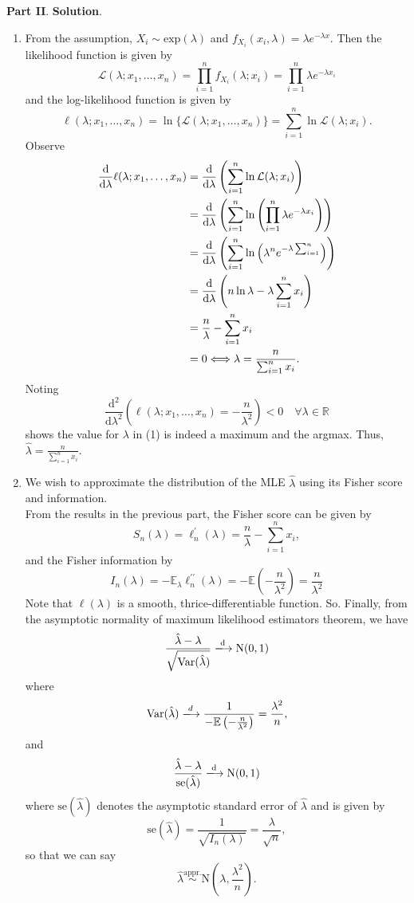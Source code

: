 \documentclass{article}
\begin{document}
\textbf{Part II}. \textbf{Solution}.
\begin{enumerate}
    \item From the assumption, $X_i \sim \text{exp}(\lambda)$ and $f_{X_i}(x_i, \lambda) = \lambda e^{-\lambda x}$. Then the likelihood function is given by \[\mathcal{L}(\lambda; x_1, \ldots, x_n) = \prod_{i=1}^n f_{X_i}(\lambda; x_i) = \prod_{i=1}^n \lambda e^{-\lambda x_i}\]and the log-likelihood function is given by \[\ell(\lambda; x_1, \ldots, x_n) = \ln \{ \mathcal{L}(\lambda; x_1, \ldots, x_n)\} = \sum_{i=1}^n \ln \mathcal{L}(\lambda; x_i).\]
    Observe
    \begin{align}
        \frac{\mathrm{d}}{\mathrm{d}\lambda}\ell(\lambda; x_1, \ldots, x_n) &=  \frac{\mathrm{d}}{\mathrm{d\lambda}}\left(\sum_{i=1}^n \ln \mathcal{L}(\lambda; x_i)\right) \notag \\
        &= \frac{\mathrm{d}}{\mathrm{d}\lambda}\left(\sum_{i=1}^n \ln \left( \prod_{i=1}^n \lambda e^{-\lambda x_i} \right) \right) \notag \\
        &= \frac{\mathrm{d}}{\mathrm{d}\lambda}\left(\sum_{i=1}^n \ln \left( \lambda^n e^{-\lambda \sum_{i=1}^n} \right) \right) \notag \\
        &= \frac{\mathrm{d}}{\mathrm{d}\lambda}\left( n \ln \lambda -\lambda \sum_{i=1}^n x_i \right) \notag \\
        &= \frac{n}{\lambda} - \sum_{i=1}^n x_i \notag \\
        &= 0 \Longleftrightarrow \lambda = \frac{n}{\sum_{i=1}^n x_i}.
    \end{align}
    Noting
    \[\frac{\mathrm{d}^2}{\mathrm{d}\lambda^2}\left( \ell(\lambda; x_1, \ldots, x_n) = -\frac{n}{\lambda^2}\right) < 0 \quad \forall \lambda \in \mathbb{R} \]shows the value for $\lambda$ in (1) is indeed a maximum and the argmax. Thus, $\hat{\lambda} = \frac{n}{\sum_{i=1}^n x_i}.$
    \item We wish to approximate the distribution of the MLE $\hat{\lambda}$ using its Fisher score and information.\\From the results in the previous part, the Fisher score can be given by \[S_n(\lambda) = \ell^\prime_n(\lambda) = \frac{n}{\lambda} - \sum_{i=1}^n x_i, \]and the Fisher information by \[I_n(\lambda) = -\mathbb{E}_\lambda \ell^{\prime \prime} _n(\lambda) = -\mathbb{E}\left(-\frac{n}{\lambda^2}\right) = \frac{n}{\lambda^2}\]
    Note that $\ell(\lambda)$ is a smooth, thrice-differentiable function. So. Finally, from the asymptotic normality of maximum likelihood estimators theorem, we have \[\frac{\hat{\lambda} - \lambda}{\sqrt{\text{Var}(\hat{\lambda})}} \xlongrightarrow{\text{d}} \text{N}(0,1)\]where \[\text{Var}(\hat{\lambda}) \xlongrightarrow{d} \frac{1}{-\mathbb{E}\left(-\frac{n}{\lambda^2}\right)} = \frac{\lambda^2}{n},\] and \[\frac{\hat{\lambda} - \lambda}{\text{se}(\hat{\lambda})} \xlongrightarrow{\text{d}} \text{N}(0,1)\]where $\text{se}(\hat{\lambda})$ denotes the asymptotic standard error of $\hat{\lambda}$ and is given by \[\text{se}(\hat{\lambda}) = \frac{1}{\sqrt{I_n(\lambda)}} = \frac{\lambda}{\sqrt{n}},\]so that we can say \[\hat{\lambda} \overset{\text{appr.}}{\sim} \text{N}(\lambda, \frac{\lambda^2}{n}).\]

\end{enumerate}
\end{document}
